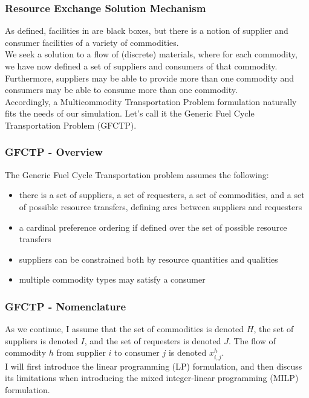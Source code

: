 \begin{frame}[ctb!]
  \frametitle{Resource Exchange Solution Mechanism}
  
  As defined, facilities in \Cyclus are black boxes, but there is a notion of
  supplier and consumer facilities of a variety of commodities.\\

  We seek a solution to a flow of (discrete) materials, where for each
  commodity, we have now defined a set of suppliers and consumers of that
  commodity.\\ 
  
  Furthermore, suppliers may be able to provide more than one commodity and
  consumers may be able to consume more than one commodity.\\

  Accordingly, a Multicommodity Transportation Problem formulation naturally
  fits the needs of our simulation. Let's call it the Generic Fuel Cycle
  Transportation Problem (GFCTP).
  
\end{frame}

\begin{frame}[ctb!]
  \frametitle{GFCTP - Overview}
  
  The Generic Fuel Cycle Transportation problem assumes the following:

  \begin{itemize}
    \item there is a set of suppliers, a set of requesters, a set of
      commodities, and a set of possible resource transfers, defining arcs
      between suppliers and requesters
    \item a cardinal preference ordering if defined over the set of possible
      resource transfers
    \item suppliers can be constrained both by resource quantities and qualities
    \item multiple commodity types may satisfy a consumer
  \end{itemize}

\end{frame}
  

\begin{frame}[ctb!]
  \frametitle{GFCTP - Nomenclature}

  As we continue, I assume that the set of commodities is denoted $H$, the set
  of suppliers is denoted $I$, and the set of requesters is denoted $J$. The
  flow of commodity $h$ from supplier $i$ to consumer $j$ is denoted
  $x^h_{i,j}$.\\

  I will first introduce the linear programming (LP) formulation, and then
  discuss its limitations when introducing the mixed integer-linear programming
  (MILP) formulation.

\end{frame}

